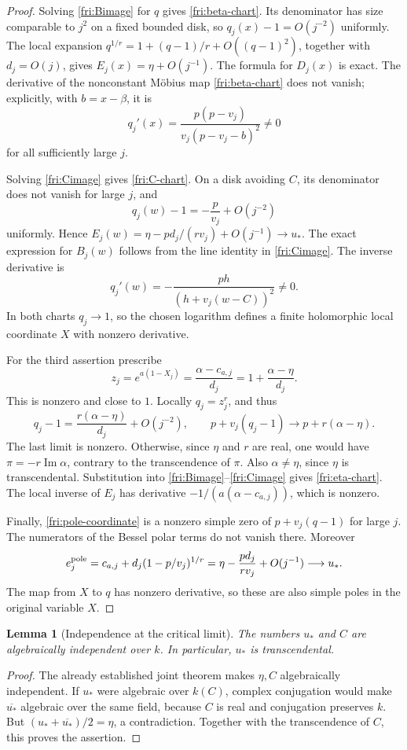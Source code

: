 \documentclass[11pt]{article}
\newtheorem{lemma}[theorem]{Lemma}
\theoremstyle{definition}
\theoremstyle{remark}
\begin{document}
\begin{proof}
Solving \eqref{fri:Bimage} for $q$ gives
\eqref{fri:beta-chart}.  Its denominator has size comparable to
$j^2$ on a fixed bounded disk, so $q_j(x)-1=O(j^{-2})$ uniformly.
The local expansion $q^{1/r}=1+(q-1)/r+O((q-1)^2)$, together with
$d_j=O(j)$, gives $E_j(x)=\eta+O(j^{-1})$.
The formula for $D_j(x)$ is exact.  The derivative of the nonconstant
M\"obius map \eqref{fri:beta-chart} does not vanish; explicitly, with
$b=x-\beta$, it is
\[
 q_j'(x)=\frac{p(p-v_j)}{v_j(p-v_j-b)^2}\ne0
\]
for all sufficiently large $j$.

Solving \eqref{fri:Cimage} gives \eqref{fri:C-chart}.  On a disk
avoiding $C$, its denominator does not vanish for large $j$, and
\[
 q_j(w)-1=-\frac{p}{v_j}+O(j^{-2})
\]
uniformly.  Hence $E_j(w)=\eta-pd_j/(rv_j)+O(j^{-1})\to u_*$.
The exact expression for $B_j(w)$ follows from the line identity in
\eqref{fri:Cimage}.  The inverse derivative is
\[
 q_j'(w)=-\frac{ph}{(h+v_j(w-C))^2}\ne0.
\]
In both charts $q_j\to1$, so the chosen logarithm defines a finite
holomorphic local coordinate $X$ with nonzero derivative.

For the third assertion prescribe
\[
 z_j=e^{a(1-X_j)}
     =\frac{\alpha-c_{a,j}}{d_j}
     =1+\frac{\alpha-\eta}{d_j}.
\]
This is nonzero and close to $1$.  Locally $q_j=z_j^r$, and thus
\[
 q_j-1=\frac{r(\alpha-\eta)}{d_j}+O(j^{-2}),
 \qquad
 p+v_j(q_j-1)\longrightarrow p+r(\alpha-\eta).
\]
The last limit is nonzero.  Otherwise, since $\eta$ and $r$ are real,
one would have $\pi=-r\operatorname{Im}\alpha$, contrary to the
transcendence of $\pi$.  Also $\alpha\ne\eta$, since $\eta$ is
transcendental.  Substitution into \eqref{fri:Bimage}--\eqref{fri:Cimage}
gives \eqref{fri:eta-chart}.  The local inverse of $E_j$ has derivative
$-1/(a(\alpha-c_{a,j}))$, which is nonzero.

Finally, \eqref{fri:pole-coordinate} is a nonzero simple zero of
$p+v_j(q-1)$ for large $j$.  The numerators of the Bessel polar terms
do not vanish there.  Moreover
\[
 e_j^{\rm pole}
 =c_{a,j}+d_j(1-p/v_j)^{1/r}
 =\eta-\frac{pd_j}{rv_j}+O(j^{-1})\longrightarrow u_*.
\]
The map from $X$ to $q$ has nonzero derivative, so these are also
simple poles in the original variable $X$.
\end{proof}

\begin{lemma}[Independence at the critical limit]\label{fri:critical-independent}
The numbers $u_*$ and $C$ are algebraically independent over $k$.
In particular, $u_*$ is transcendental.
\end{lemma}
\begin{proof}
The already established joint theorem makes $\eta,C$ algebraically
independent.  If $u_*$ were algebraic over $k(C)$, complex conjugation
would make $\overline{u_*}$ algebraic over the same field, because
$C$ is real and conjugation preserves $k$.  But
$(u_*+\overline{u_*})/2=\eta$, a contradiction.  Together with the
transcendence of $C$, this proves the assertion.
\end{proof}
\end{document}
